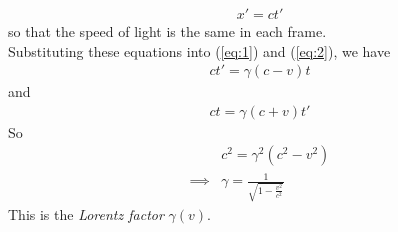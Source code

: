 \documentclass[a4paper]{article}
\begin{document}
\begin{equation*}
\begin{aligned}
x'=ct'
\end{aligned}
\end{equation*}
so that the speed of light is the same in each frame.\\
Substituting these equations into (\ref{eq:1}) and (\ref{eq:2}), we have
\begin{equation*}
\begin{aligned}
ct' = \gamma \left(c-v\right)t
\end{aligned}
\end{equation*}
and
\begin{equation*}
\begin{aligned}
ct = \gamma \left(c+v\right) t'
\end{aligned}
\end{equation*}
So
\begin{equation*}
\begin{aligned}
&c^2 = \gamma^2 \left(c^2-v^2\right)\\
\implies &\gamma = \frac{1}{\sqrt{1-\frac{v^2}{c^2}}}
\end{aligned}
\end{equation*}
This is the \emph{Lorentz factor} $\gamma\left(v\right)$.
\end{document}
